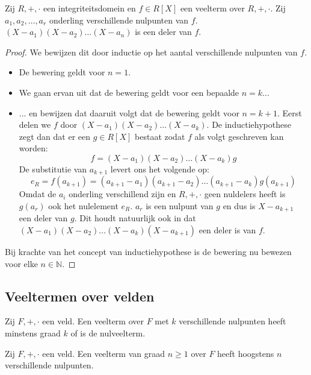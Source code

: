 \documentclass[main.tex]{subfiles}
\begin{document}
\begin{st}
  \label{st:domein-nulpunten-delen-veelterm}
  Zij $R,+,\cdot$ een integriteitsdomein en $f\in R[X]$ een veelterm over $R,+,\cdot$.
  Zij $a_{1},a_{2},\dotsc,a_{r}$ onderling verschillende nulpunten van $f$.
  $(X-a_{1})(X-a_{2}) \dotsc (X-a_{n})$ is een deler van $f$.

  \begin{proof}
    We bewijzen dit door inductie op het aantal verschillende nulpunten van $f$.
    \begin{itemize}
    \item De bewering geldt voor $n=1$.
    \item We gaan ervan uit dat de bewering geldt voor een bepaalde $n=k$...
    \item ... en bewijzen dat daaruit volgt dat de bewering geldt voor $n=k+1$.
      Eerst delen we $f$ door $(X-a_{1})(X-a_{2})\dotsc(X-a_{k})$.
      De inductiehypothese zegt dan dat er een $g\in R[X]$ bestaat zodat $f$ als volgt geschreven kan worden:
      \[ f = (X-a_{1})(X-a_{2})\dotsc(X-a_{k}) g \]
      De substitutie van $a_{k+1}$ levert ons het volgende op:
      \[ e_{R} = f(a_{k+1}) = (a_{k+1}-a_{1})(a_{k+1}-a_{2})\dotsc(a_{k+1}-a_{k})g(a_{k+1}) \]
      Omdat de $a_{i}$ onderling verschillend zijn en $R,+,\cdot$ geen nuldelers heeft is $g(a_{r})$ ook het nulelement $e_{R}$.
      $a_{r}$ is een nulpunt van $g$ en dus is $X-a_{k+1}$ een deler van $g$.
      Dit houdt natuurlijk ook in dat $(X-a_{1})(X-a_{2})\dotsc(X-a_{k})(X-a_{k+1})$ een deler is van $f$.
    \end{itemize}
    Bij krachte van het concept van inductiehypothese is de bewering nu bewezen voor elke $n\in \mathbb{N}$.
  \end{proof}
\end{st}

\subsection{Veeltermen over velden}
\label{sec:veelt-over-veld}

\begin{st}
  Zij $F,+,\cdot$ een veld.
  Een veelterm over $F$ met $k$ verschillende nulpunten heeft minstens graad $k$ of is de nulveelterm.
\end{st}
\begin{st}
  Zij $F,+,\cdot$ een veld.
  Een veelterm van graad $n \ge 1$ over $F$ heeft hoogstens $n$ verschillende nulpunten.
\end{st}
\end{document}
